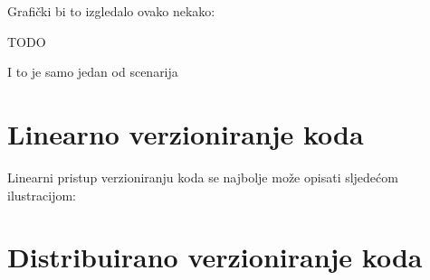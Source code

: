 Grafički bi to izgledalo ovako nekako:

TODO

I to je samo jedan od scenarija

\section*{Linearno verzioniranje koda}

Linearni pristup verzioniranju koda se najbolje može opisati sljedećom ilustracijom:



\section*{Distribuirano verzioniranje koda}

